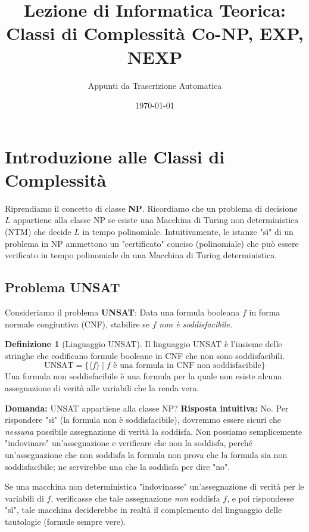 \documentclass[a4paper]{article}
\title{Lezione di Informatica Teorica: \\ Classi di Complessità Co-NP, EXP, NEXP}
\author{Appunti da Trascrizione Automatica}
\date{\today}
\theoremstyle{definition} %
\newtheorem{definition}{Definizione}
\begin{document}
\maketitle
\tableofcontents
\newpage

\section{Introduzione alle Classi di Complessità}

Riprendiamo il concetto di classe \textbf{NP}. Ricordiamo che un problema di decisione $L$ appartiene alla classe NP se esiste una Macchina di Turing non deterministica (NTM) che decide $L$ in tempo polinomiale. Intuitivamente, le istanze "sì" di un problema in NP ammettono un "certificato" conciso (polinomiale) che può essere verificato in tempo polinomiale da una Macchina di Turing deterministica.

\subsection{Problema UNSAT}

Consideriamo il problema \textbf{UNSAT}:
Data una formula booleana $f$ in forma normale congiuntiva (CNF), stabilire se $f$ \textit{non è soddisfacibile}.

\begin{definition}[Linguaggio UNSAT]
Il linguaggio UNSAT è l'insieme delle stringhe che codificano formule booleane in CNF che non sono soddisfacibili.
\[
\text{UNSAT} = \{ \langle f \rangle \mid f \text{ è una formula in CNF non soddisfacibile} \}
\]
Una formula non soddisfacibile è una formula per la quale non esiste alcuna assegnazione di verità alle variabili che la renda vera.
\end{definition}

\textbf{Domanda:} UNSAT appartiene alla classe NP?
\textbf{Risposta intuitiva:} No. Per rispondere "sì" (la formula non è soddisfacibile), dovremmo essere sicuri che \textit{nessuna} possibile assegnazione di verità la soddisfa. Non possiamo semplicemente "indovinare" un'assegnazione e verificare che non la soddisfa, perché un'assegnazione che non soddisfa la formula non prova che la formula sia non soddisfacibile; ne servirebbe una che la soddisfa per dire "no".

Se una macchina non deterministica "indovinasse" un'assegnazione di verità per le variabili di $f$, verificasse che tale assegnazione \textit{non} soddisfa $f$, e poi rispondesse "sì", tale macchina deciderebbe in realtà il complemento del linguaggio delle tautologie (formule sempre vere).
\end{document}
